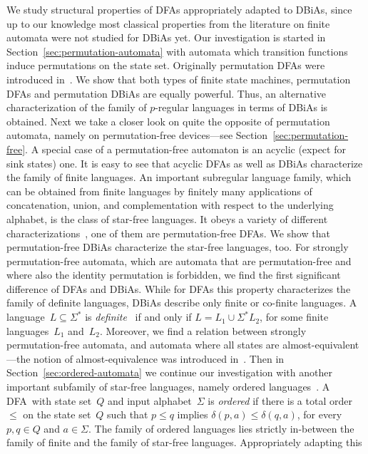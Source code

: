 \documentclass[submission]{eptcs}
\newcommand{\dfa}{\textrm{DFA}}
\newcommand{\dbia}{\textrm{DBiA}}
\begin{document}
We study structural properties of \dfa s appropriately adapted to
\dbia s, since up to our knowledge most classical properties from the
literature on finite automata were not studied for \dbia s yet.  Our
investigation is started in Section~\ref{sec:permutation-automata}
with automata which transition functions induce permutations on the
state set. Originally permutation \dfa s were introduced
in~\cite{Th68a}. We show that both types of finite state machines,
permutation \dfa s and permutation \dbia s are equally powerful. Thus,
an alternative characterization of the family of $p$-regular languages
in terms of \dbia s is obtained. Next we take a closer look on quite
the opposite of permutation automata, namely on permutation-free
devices---see Section~\ref{sec:permutation-free}.  A special case of a
permutation-free automaton is an acyclic (expect for sink states)
one. It is easy to see that acyclic \dfa s as well as \dbia s
characterize the family of finite languages.
An important subregular language family, which can be obtained from
finite languages by finitely many applications of concatenation,
union, and complementation with respect to the underlying alphabet, is
the class of star-free languages.  It obeys a variety of different
characterizations~\cite{McNaPa71}, one of them are permutation-free
\dfa s. We show that permutation-free \dbia s characterize the
star-free languages, too. For strongly permutation-free automata,
which are automata that are permutation-free and where also the
identity permutation is forbidden, we find the first significant
difference of \dfa s and \dbia s. While for \dfa s this property
characterizes the family of definite languages, \dbia s describe only
finite or co-finite languages. A language~$L\subseteq\Sigma^*$ is
\emph{definite}~\cite{PRS63} if and only if $L=L_1\cup\Sigma^*L_2$,
for some finite languages~$L_1$ and~$L_2$.  Moreover, we find a
relation between strongly permutation-free automata, and automata
where all states are almost-equivalent---the notion of
almost-equivalence was introduced in~\cite{BGS09}.  Then in
Section~\ref{sec:ordered-automata} we continue our investigation with
another important subfamily of star-free languages, namely ordered
languages~\cite{ShTh74}. A \dfa\ with state set~$Q$ and input
alphabet~$\Sigma$ is \emph{ordered} if there is a total order~$\leq$
on the state set~$Q$ such that $p\leq q$ implies $\delta(p,a)\leq
\delta(q,a)$, for every $p,q\in Q$ and $a\in\Sigma$. The family of
ordered languages lies strictly in-between the family of finite and
the family of star-free languages. Appropriately adapting this
\end{document}
